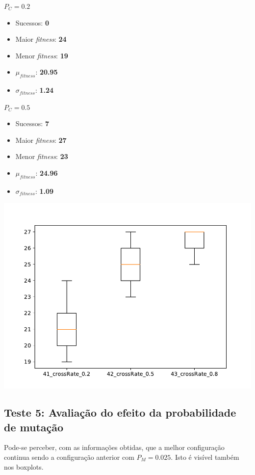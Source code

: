 \documentclass[11pt,a4paper]{article}
\begin{document}
\begin{minipage}{0.25\linewidth}
\textbf{$P_C=0.2$}
\begin{itemize}
	\footnotesize
	\setlength\itemsep{0em}
	\item Sucessos: \textbf{0}
	\item Maior \textit{fitness}: \textbf{24}
	\item Menor \textit{fitness}: \textbf{19}
	\item $\mu_{\textit{fitness}}$: \textbf{20.95}
	\item $\sigma_{\textit{fitness}}$: \textbf{1.24}
\end{itemize}
\end{minipage}
\begin{minipage}{0.25\linewidth}
\textbf{$P_C=0.5$}
\begin{itemize}
	\footnotesize
	\setlength\itemsep{0em}
	\item Sucessos: \textbf{7}
	\item Maior \textit{fitness}: \textbf{27}
	\item Menor \textit{fitness}: \textbf{23}
	\item $\mu_{\textit{fitness}}$: \textbf{24.96}
	\item $\sigma_{\textit{fitness}}$: \textbf{1.09}
\end{itemize}
\end{minipage}
\begin{minipage}{0.5\linewidth}
\includegraphics[scale=0.48]{teste4.pdf}
\end{minipage}


\subsection{Teste 5: Avaliação do efeito da probabilidade de mutação}
Pode-se perceber, com as informações obtidas, que a melhor configuração continua sendo a configuração anterior com $P_M=0.025$. Isto é visível também nos boxplots.\\
\end{document}
